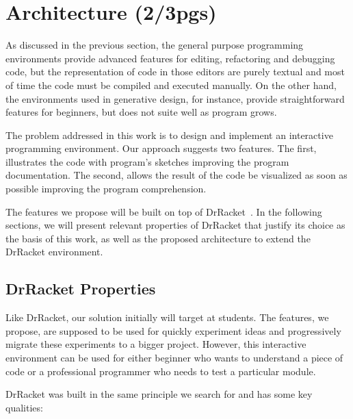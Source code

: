 
% 
% 

\section{Architecture (2/3pgs)}
\label{sec:arch}

As discussed in the previous section, the general purpose programming environments provide advanced features for editing, refactoring and debugging code, but the representation of code in those editors are purely textual and most of time the code must be compiled and executed manually. On the other hand, the environments used in generative design, for instance, provide straightforward features for beginners, but does not suite well as program grows.

The problem addressed in this work is to design and implement an interactive programming environment. Our approach suggests two features. The first, illustrates the code with program's sketches improving the program documentation. The second, allows the result of the code be visualized as soon as possible improving the program comprehension.

The features we propose will be built on top of DrRacket~\cite{findler2002drscheme}. In the following sections, we will present relevant properties of DrRacket that justify its choice as the basis of this work, as well as the proposed architecture to extend the DrRacket environment.

\subsection{DrRacket Properties}

Like DrRacket, our solution initially will target at students. The features, we propose, are supposed to be used for quickly experiment ideas and progressively migrate these experiments to a bigger project. However, this interactive environment can be used for either beginner who wants to understand a piece of code or a professional programmer who needs to test a particular module.

DrRacket was built in the same principle we search for and has some key qualities:

